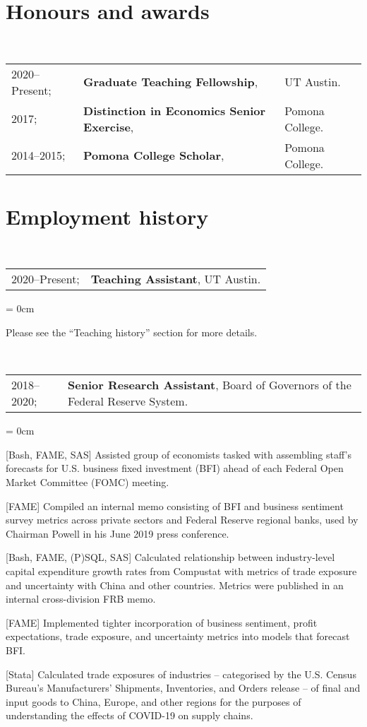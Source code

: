 \documentclass[a4paper, 11pt]{article}
\begin{document}
  \section{Honours and awards}
  ~\begin{tabular}{lll}
    2020--Present; & \textbf{Graduate Teaching Fellowship}, & UT Austin.\\
    2017; & \textbf{Distinction in Economics Senior Exercise}, & Pomona College.\\
    2014--2015; & \textbf{Pomona College Scholar}, & Pomona College.
  \end{tabular}
  \vspace*{0.25em}

  \section{Employment history}
  ~\begin{tabular}{ll}
    2020--Present; & \textbf{Teaching Assistant}, UT Austin.
  \end{tabular}
  \begin{compactitem}\parskip = 0cm
    \item Please see the ``Teaching history'' section for more details.
  \end{compactitem}
  \vspace*{1.25em}

  ~\begin{tabular}{ll}
    2018--2020; & \textbf{Senior Research Assistant}, Board of Governors of the Federal Reserve System.
  \end{tabular}
  \begin{compactitem}\parskip = 0cm
    \item {[Bash, FAME, SAS]} Assisted group of economists tasked with assembling staff's forecasts for U.S. business fixed investment (BFI) ahead of each Federal Open Market Committee (FOMC) meeting.
    \item {[FAME]} Compiled an internal memo consisting of BFI and business sentiment survey metrics across private sectors and Federal Reserve regional banks, used by Chairman Powell in his June 2019 press conference.
    \item {[Bash, FAME, (P)SQL, SAS]} Calculated relationship between industry-level capital expenditure growth rates from Compustat with metrics of trade exposure and uncertainty with China and other countries. Metrics were published in an internal cross-division FRB memo.
    \item {[FAME]} Implemented tighter incorporation of business sentiment, profit expectations, trade exposure, and uncertainty metrics into models that forecast BFI.
    \item {[Stata]} Calculated trade exposures of industries -- categorised by the U.S. Census Bureau's Manufacturers' Shipments, Inventories, and Orders release -- of final and input goods to China, Europe, and other regions for the purposes of understanding the effects of COVID-19 on supply chains.
  \end{compactitem}
  \vspace*{1.25em}
      
\end{document}
